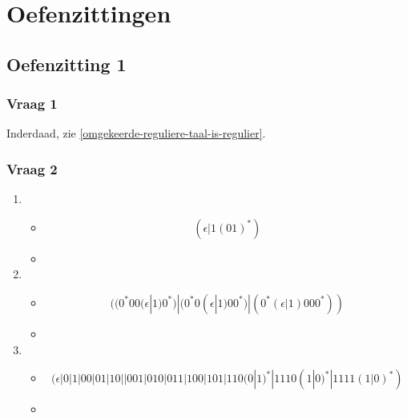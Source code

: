 \documentclass[main.tex]{subfiles}
\begin{document}
\chapter{Oefenzittingen}
\label{cha:oefenzittingen}

\section{Oefenzitting 1}
\label{sec:oefenzitting-1}

\subsection*{Vraag 1}
Inderdaad, zie \ref{omgekeerde-reguliere-taal-is-regulier}.

\subsection*{Vraag 2}
\begin{enumerate}
\item
  \begin{itemize}
  \item \[ (\epsilon|1(01)^{*}) \]
  \item {}
  \end{itemize}
\item
  \begin{itemize}
  \item \[ ((0^{*}00(\epsilon|1)0^{*})|(0^{*}0(\epsilon|1)00^{*})|(0^{*}(\epsilon|1)000^{*})) \]
  \item {}
  \end{itemize}
\item
  \begin{itemize}
  \item \[ (\epsilon|0|1|00|01|10||001|010|011|100|101|110(0|1)^{*}|1110(1|0)^{*}|1111(1|0)^{*}) \]
  \item {}
  \end{itemize}
\end{enumerate}
\end{document}
